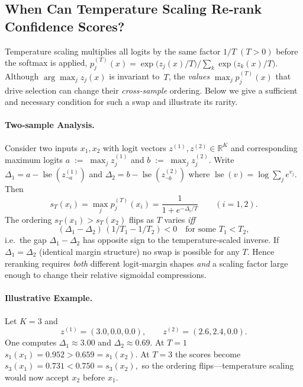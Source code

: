 \subsection{When Can Temperature Scaling Re‑rank Confidence Scores?}
\label{app:ts-rerank}

Temperature scaling multiplies all logits by the same factor
\(1/T\;(T>0)\) before the softmax is applied,
\(
p^{(T)}_j(x)=
\exp\bigl(z_j(x)/T\bigr)\bigl/\sum_k \exp\bigl(z_k(x)/T\bigr).
\)
Although \(\arg\max_j z_j(x)\) is invariant to~\(T\), the \emph{values}
\(\max_j p^{(T)}_j(x)\) that drive selection can change their
\emph{cross‑sample} ordering.  Below we give a sufficient and necessary
condition for such a swap and illustrate its rarity.

\paragraph{Two‑sample Analysis.}
Consider two inputs \(x_1,x_2\) with logit vectors
\(z^{(1)},z^{(2)}\in\mathbb{R}^K\) and corresponding maximum logits
\(a\;{:=}\;\max_j z^{(1)}_j\) and \(b\;{:=}\;\max_j z^{(2)}_j\).
Write
\(\Delta_1=a-\operatorname*{lse}(z^{(1)}_{\neg a})\)
and
\(\Delta_2=b-\operatorname*{lse}(z^{(2)}_{\neg b})\)
where
\(\operatorname*{lse}(v)=\log\sum_j e^{v_j}\).
Then
\begin{equation}
  s_T(x_i)=\max_j p^{(T)}_j(x_i)
          =\frac1{1+e^{-\Delta_i/T}}\qquad(i=1,2).
\end{equation}
The ordering \(s_T(x_1)>s_T(x_2)\) flips as \(T\) varies \emph{iff}
\begin{equation}\label{eq:swap-condition}
  (\Delta_1-\Delta_2)\,(1/T_1-1/T_2)<0
  \quad\text{for some }T_1<T_2,
\end{equation}
i.e.\ the gap \(\Delta_1-\Delta_2\) has opposite sign to the
temperature‑scaled inverse.  If
\(\Delta_1=\Delta_2\) (identical margin structure) no swap is possible
for any \(T\).  Hence reranking requires \emph{both} different
logit‑margin shapes \emph{and} a scaling factor large enough to change
their relative sigmoidal compressions.

\paragraph{Illustrative Example.}
Let \(K=3\) and
\begin{equation}
z^{(1)}=(3.0,0.0,0.0),\qquad
z^{(2)}=(2.6,2.4,0.0).
\end{equation}
One computes \(\Delta_1\approx 3.00\) and
\(\Delta_2\approx 0.69\).  At \(T=1\)
\(
s_1(x_1)=0.952>0.659=s_1(x_2).
\)
At \(T=3\) the scores become
\(
s_3(x_1)=0.731 < 0.750 = s_3(x_2),
\)
so the ordering flips---temperature scaling would now accept \(x_2\)
before \(x_1\).

